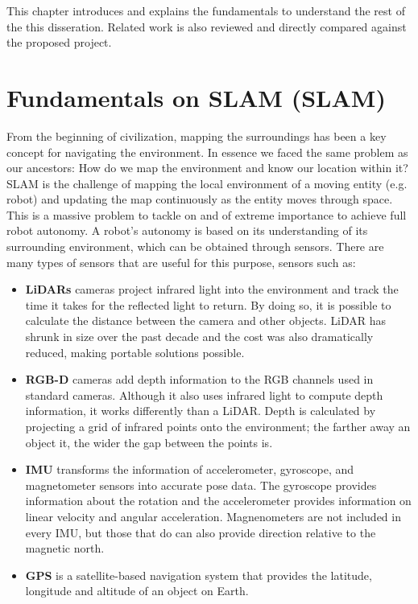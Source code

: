 This chapter introduces and explains the fundamentals to understand the rest of the this disseration. Related work is also reviewed and directly compared against the proposed project.

\section{Fundamentals on \acl*{SLAM} (\acs*{SLAM})}

From the beginning of civilization, mapping the surroundings has been a key concept for navigating the environment. In essence we faced the same problem as our ancestors: How do we map the environment and know our location within it? \acs*{SLAM} is the challenge of mapping the local environment of a moving entity (e.g. robot) and updating the map continuously as the entity moves through space. This is a massive problem to tackle on and of extreme importance to achieve full robot autonomy. A robot's autonomy is based on its understanding of its surrounding environment, which can be obtained through sensors. There are many types of sensors that are useful for this purpose, sensors such as:
\begin{itemize}
    \item \textbf{\acs*{LiDAR}s} cameras project infrared light into the environment and track the time it takes for the reflected light to return. By doing so, it is possible to calculate the distance between the camera and other objects. \acs*{LiDAR} has shrunk in size over the past decade and the cost was also dramatically reduced, making portable solutions possible.
    \item \textbf{RGB-D} cameras add depth information to the RGB channels used in standard cameras. Although it also uses infrared light to compute depth information, it works differently than a \acs*{LiDAR}. Depth is calculated by projecting a grid of infrared points onto the environment; the farther away an object it, the wider the gap between the points is.
    \item \textbf{\acs*{IMU}} transforms the information of accelerometer, gyroscope, and magnetometer sensors into accurate pose data. The gyroscope provides information about the rotation and the accelerometer provides information on linear velocity and angular acceleration. Magnenometers are not included in every \acs*{IMU}, but those that do can also provide direction relative to the magnetic north.
    \item \textbf{\acs*{GPS}} is a satellite-based navigation system that provides the latitude, longitude and altitude of an object on Earth.
\end{itemize}

